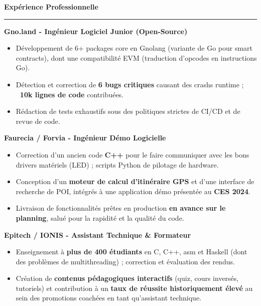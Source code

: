 \documentclass[9pt]{extarticle}
\begin{document}
\par\vspace{5pt}

{\large\bfseries Expérience Professionnelle}
\par\vspace{-8pt}
\rule{\linewidth}{0.4pt}
\par\vspace{5pt}

{\bfseries Gno.land - Ingénieur Logiciel Junior (Open-Source)}
\begin{itemize}[noitemsep, topsep=0pt]
	\item Développement de 6+ packages core en Gnolang (variante de Go pour smart contracts), dont une compatibilité EVM (traduction d'opcodes en instructions Go).
	\item Détection et correction de {\bfseries 6 bugs critiques} causant des crashs runtime ; {\bfseries ~10k lignes de code} contribuées.
	\item Rédaction de tests exhaustifs sous des politiques strictes de CI/CD et de revue de code.
\end{itemize}

\par\vspace{5pt}

{\bfseries Faurecia / Forvia - Ingénieur Démo Logicielle}
\begin{itemize}[noitemsep, topsep=0pt]
	\item Correction d'un ancien code {\bfseries C++} pour le faire communiquer avec les bons drivers matériels (LED) ; scripts Python de pilotage de hardware.
	\item Conception d'un {\bfseries moteur de calcul d'itinéraire GPS} et d'une interface de recherche de POI, intégrés à une application démo présentée au {\bfseries CES 2024}.
	\item Livraison de fonctionnalités prêtes en production {\bfseries en avance sur le planning}, salué pour la rapidité et la qualité du code.
\end{itemize}

\par\vspace{5pt}

{\bfseries Epitech / IONIS - Assistant Technique \& Formateur}
\begin{itemize}[noitemsep, topsep=0pt]
	\item Enseignement à {\bfseries plus de 400 étudiants} en C, C++, asm et Haskell (dont des problèmes de multithreading) ; correction et évaluation des rendus.
	\item Création de {\bfseries contenus pédagogiques interactifs} (quiz, cours inversés, tutoriels) et contribution à un {\bfseries taux de réussite historiquement élevé} au sein des promotions coachées en tant qu'assistant technique.
\end{itemize}
\end{document}
